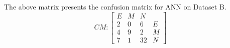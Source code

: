 \documentclass[10pt,twocolumn]{witseiepaper}
\begin{document}
The above matrix presents the confusion matrix for ANN on Dataset B. 
\[
 CM :
  \begin{bmatrix}
  \label{cm}
     E & M & N \\
     2 & 0 & 6  & E\\
     4 & 9 & 2 & M \\
     7 & 1 & 32 & N
  \end{bmatrix}
\]

\newpage
\onecolumn


\end{document}
